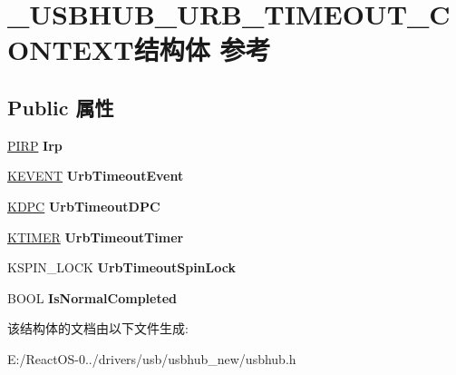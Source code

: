 \hypertarget{struct___u_s_b_h_u_b___u_r_b___t_i_m_e_o_u_t___c_o_n_t_e_x_t}{}\section{\+\_\+\+U\+S\+B\+H\+U\+B\+\_\+\+U\+R\+B\+\_\+\+T\+I\+M\+E\+O\+U\+T\+\_\+\+C\+O\+N\+T\+E\+X\+T结构体 参考}
\label{struct___u_s_b_h_u_b___u_r_b___t_i_m_e_o_u_t___c_o_n_t_e_x_t}
\subsection*{Public 属性}
\begin{DoxyCompactItemize}
\item 
\mbox{\label{struct___u_s_b_h_u_b___u_r_b___t_i_m_e_o_u_t___c_o_n_t_e_x_t_a92edfd13297215c49a0bd57e4b3b23cc}} 
\hyperlink{interfacevoid}{P\+I\+RP} {\bfseries Irp}
\item 
\mbox{\label{struct___u_s_b_h_u_b___u_r_b___t_i_m_e_o_u_t___c_o_n_t_e_x_t_a37255ebf7ae8ee971731e8ccd66605e2}} 
\hyperlink{struct___k_e_v_e_n_t}{K\+E\+V\+E\+NT} {\bfseries Urb\+Timeout\+Event}
\item 
\mbox{\label{struct___u_s_b_h_u_b___u_r_b___t_i_m_e_o_u_t___c_o_n_t_e_x_t_a62a9038916023ea25088923952cc89cf}} 
\hyperlink{struct___k_d_p_c}{K\+D\+PC} {\bfseries Urb\+Timeout\+D\+PC}
\item 
\mbox{\label{struct___u_s_b_h_u_b___u_r_b___t_i_m_e_o_u_t___c_o_n_t_e_x_t_a381afef20a06a35a20e1662fbb8b81f5}} 
\hyperlink{struct___k_t_i_m_e_r}{K\+T\+I\+M\+ER} {\bfseries Urb\+Timeout\+Timer}
\item 
\mbox{\label{struct___u_s_b_h_u_b___u_r_b___t_i_m_e_o_u_t___c_o_n_t_e_x_t_a71c170633bfe09898387702aff81ea2b}} 
K\+S\+P\+I\+N\+\_\+\+L\+O\+CK {\bfseries Urb\+Timeout\+Spin\+Lock}
\item 
\mbox{\label{struct___u_s_b_h_u_b___u_r_b___t_i_m_e_o_u_t___c_o_n_t_e_x_t_a43dd30524a1d37b12c7c551ed53c9771}} 
B\+O\+OL {\bfseries Is\+Normal\+Completed}
\end{DoxyCompactItemize}


该结构体的文档由以下文件生成\+:\begin{DoxyCompactItemize}
\item 
E\+:/\+React\+O\+S-\/0../drivers/usb/usbhub\+\_\+new/usbhub.\+h\end{DoxyCompactItemize}

